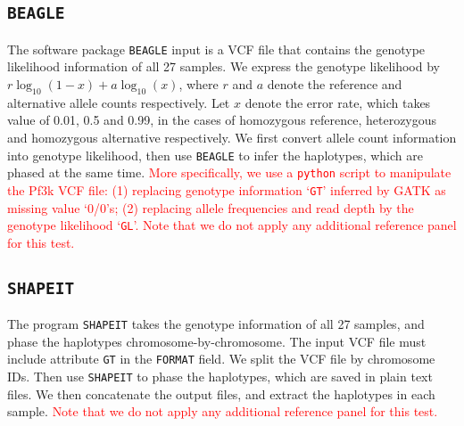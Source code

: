 \documentclass{article}
\begin{document}
\subsection{\texttt{BEAGLE}}
The software package \texttt{BEAGLE} input is a VCF file that contains the genotype likelihood information of all 27 samples. We express the genotype likelihood by $r \log_{10}(1-x) + a \log_{10}(x)$, where $r$ and $a$ denote the reference and alternative allele counts respectively. Let $x$ denote the error rate, which takes value of 0.01, 0.5 and 0.99, in the cases of homozygous reference, heterozygous and homozygous alternative respectively.
We first convert allele count information into genotype likelihood, then use \texttt{BEAGLE} to infer the haplotypes, which are phased at the same time. \textcolor{red}{More specifically, we use a \texttt{python} script to manipulate the Pf3k VCF file: (1) replacing genotype information `\texttt{GT}' inferred by GATK as missing value `0/0's; (2) replacing allele frequencies and read depth by the genotype likelihood `\texttt{GL}'. Note that we do not apply any additional reference panel for this test. }


\subsection{\texttt{SHAPEIT}}
The program \texttt{SHAPEIT} takes the genotype information of all 27 samples, and phase the haplotypes chromosome-by-chromosome. The input VCF file must include attribute \texttt{GT} in the \texttt{FORMAT} field. We split the VCF file by chromosome IDs. Then use \texttt{SHAPEIT} to phase the haplotypes, which are saved in plain text files. We then concatenate the output files, and extract the haplotypes in each sample. \textcolor{red}{Note that we do not apply any additional reference panel for this test. }
\end{document}
